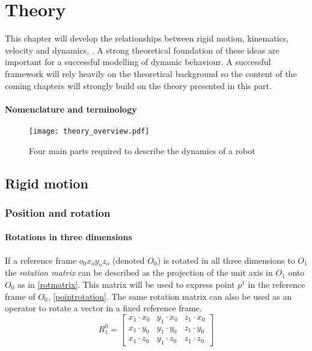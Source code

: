 \chapter{Theory}
This chapter will develop the relationships between rigid motion, kinematics, velocity and dynamics, . A strong theoretical foundation of these ideas are important for a successful modelling of dynamic behaviour. A successful framework will rely heavily on the theoretical background so the content of the coming chapters will strongly build on the theory presented in this part.

\subsubsection{Nomenclature and terminology}


\begin{figure}
 \centering 
 \texttt{[image: theory\_overview.pdf]}
 \caption{Four main parts required to describe the dynamics of a robot}
 \label{theory_overview}
\end{figure}

\section{Rigid motion}
\subsection{Position and rotation}
\subsubsection{Rotations in three dimensions}

If a reference frame $o_0 x_o y_o z_o$ (denoted $O_0$) is rotated in all three dimensions to $O_1$ the \textit{rotation matrix} can be described as the projection of the unit axis in $O_1$ onto $O_0$ as in \eqref{rotmatrix}. This matrix will be used to express point $p^1$ in the reference frame of $O_0$, \eqref{pointrotation}. The same rotation matrix can also be used as an operator to rotate a vector in a fixed reference frame.
\begin{equation}\label{rotmatrix}
R^0_1=\begin{bmatrix}
x_1\cdot x_0 & y_1\cdot x_0 & z_1\cdot x_0\\ 
x_1\cdot y_0 & y_1\cdot y_0 & z_1\cdot y_0\\ 
x_1\cdot z_0 & y_1\cdot z_0 & z_1\cdot z_0
\end{bmatrix}
\end{equation}

